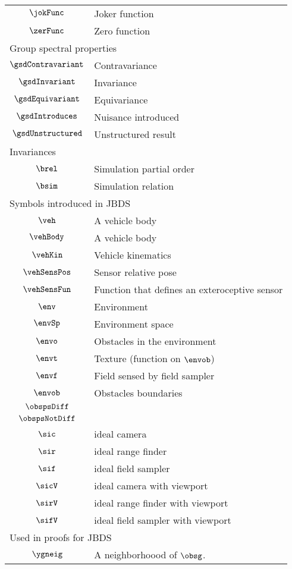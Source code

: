 \begin{longtable}{cl}
 $\jokFunc$ &  Joker function\\ 
 $\zerFunc$ &  Zero function\\ 
 \multicolumn{2}{l}{Group spectral properties}\\ 
 \hline
$\gsdContravariant$ &  Contravariance\\ 
 $\gsdInvariant$ &  Invariance\\ 
 $\gsdEquivariant$ &  Equivariance\\ 
 $\gsdIntroduces$ &  Nuisance introduced\\ 
 $\gsdUnstructured$ &  Unstructured result\\ 
 \multicolumn{2}{l}{Invariances}\\ 
 \hline
$\brel$ &  Simulation partial order\\ 
 $\bsim$ &  Simulation relation\\ 
 \multicolumn{2}{l}{Symbols introduced in JBDS}\\ 
 \hline
$\veh$ &  A vehicle body\\ 
 $\vehBody$ &  A vehicle body\\ 
 $\vehKin$ &  Vehicle kinematics \\ 
 $\vehSensPos$ &  Sensor relative pose\\ 
 $\vehSensFun$ &  Function that defines an exteroceptive sensor\\ 
 $\env$ &  Environment\\ 
 $\envSp$ &  Environment space\\ 
 $\envo$ &  Obstacles in the environment\\ 
 $\envt$ &  Texture (function on $\envob$)\\ 
 $\envf$ &  Field sensed by field sampler\\ 
 $\envob$ &  Obstacles boundaries\\ 
 $\obspsDiff$ & \\ 
 $\obspsNotDiff$ & \\ 
 $\sic$ &  ideal camera\\ 
 $\sir$ &  ideal range finder\\ 
 $\sif$ &  ideal field sampler\\ 
 $\sicV$ &  ideal camera with viewport\\ 
 $\sirV$ &  ideal range finder with viewport\\ 
 $\sifV$ &  ideal field sampler with viewport\\ 
 \multicolumn{2}{l}{Used in proofs for JBDS}\\ 
 \hline
$\ygneig$ &  A neighborhoood of $\obsg$.\\ 

\end{longtable}
